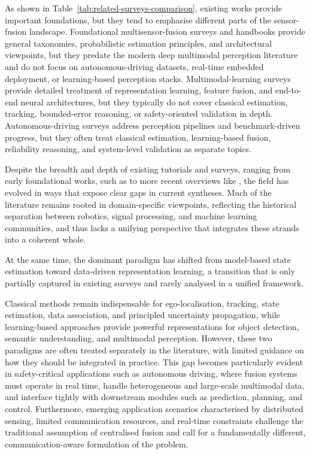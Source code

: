 \documentclass{ieeeaccess}
\begin{document}
As shown in Table~\ref{tab:related-surveys-comparison}, existing works provide important foundations, but they tend to emphasise different parts of the sensor-fusion landscape. Foundational multisensor-fusion surveys and handbooks provide general taxonomies, probabilistic estimation principles, and architectural viewpoints, but they predate the modern deep multimodal perception literature and do not focus on autonomous-driving datasets, real-time embedded deployment, or learning-based perception stacks. Multimodal-learning surveys provide detailed treatment of representation learning, feature fusion, and end-to-end neural architectures, but they typically do not cover classical estimation, tracking, bounded-error reasoning, or safety-oriented validation in depth. Autonomous-driving surveys address perception pipelines and benchmark-driven progress, but they often treat classical estimation, learning-based fusion, reliability reasoning, and system-level validation as separate topics.

Despite the breadth and depth of existing tutorials and surveys, ranging from early foundational works, such as \cite{luo_multisensor_1989, hall_introduction_1997, liggins_handbook_2009, khaleghi_multisensor_2013} to more recent overviews like \cite{baltrusaitis_multimodal_2019, 2023:IEEE_ITSM,TANG2023109165}, the field has evolved in ways that expose clear gaps in current syntheses. Much of the literature remains rooted in domain-specific viewpoints, reflecting the historical separation between robotics, signal processing, and machine learning communities, and thus lacks a unifying perspective that integrates these strands into a coherent whole.

At the same time, the dominant paradigm has shifted from model-based state estimation toward data-driven representation learning, a transition that is only partially captured in existing surveys and rarely analysed in a unified framework.

%
Classical methods remain indispensable for ego-localisation, tracking, state estimation, data association, and principled uncertainty propagation, while learning-based approaches provide powerful representations for object detection, semantic understanding, and multimodal perception. However, these two paradigms are often treated separately in the literature, with limited guidance on how they should be integrated in practice. This gap becomes particularly evident in safety-critical applications such as autonomous driving, where fusion systems must operate in real time, handle heterogeneous and large-scale multimodal data, and interface tightly with downstream modules such as prediction, planning, and control.
%
Furthermore, emerging application scenarios characterised by distributed sensing, limited communication resources, and real-time constraints challenge the traditional assumption of centralised fusion and call for a fundamentally different, communication-aware formulation of the problem.
\end{document}
